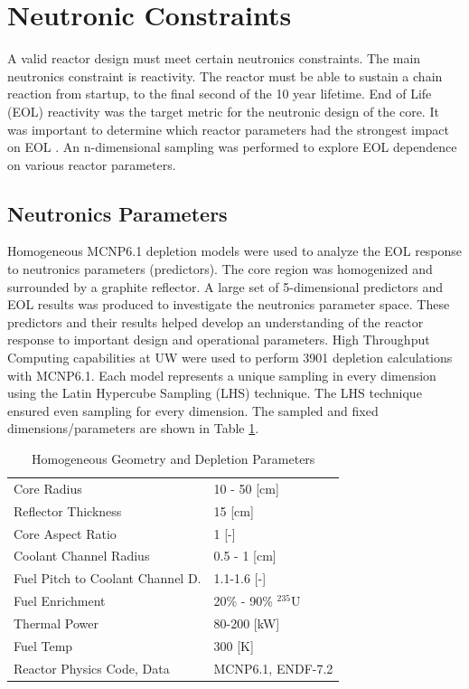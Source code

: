 \section{Neutronic Constraints}

A valid reactor design must meet certain neutronics constraints. The main
neutronics constraint is reactivity. The reactor must be able to sustain a chain
reaction from startup, to the final second of the 10 year lifetime. End of Life
(EOL) reactivity was the target metric for the neutronic design of the core. It
was important to determine which reactor parameters had the strongest impact on
EOL \keff. An n-dimensional sampling was performed to explore EOL \keff
dependence on various reactor parameters.

\subsection{Neutronics Parameters}
Homogeneous MCNP6.1 depletion models were used to analyze the EOL \keff response
to neutronics parameters (predictors). The core region was homogenized and
surrounded by a graphite reflector. A large set of 5-dimensional predictors and
EOL \keff results was produced to investigate the neutronics parameter space.
These predictors and their results helped develop an understanding of the
reactor response to important design and operational parameters. High Throughput
Computing capabilities at UW were used to perform 3901 depletion calculations
with MCNP6.1. Each model represents a unique sampling in every dimension using
the Latin Hypercube Sampling (LHS) technique. The LHS technique ensured even
sampling for every dimension. The sampled and fixed dimensions/parameters are
shown in Table \ref{tab:lhs_sweep_vars}.

\begin{table}[h]
  \centering
  \caption{Homogeneous Geometry and Depletion Parameters}
  \begin{tabular}{ll}
    \toprule
     Core Radius                		   & 10 - 50 [cm] \\
     Reflector Thickness				   & 15 [cm]\\
     Core Aspect Ratio					   & 1 [-] \\
     Coolant Channel Radius                & 0.5 - 1 [cm] \\
     Fuel Pitch to Coolant Channel D.      & 1.1-1.6 [-]\\
     Fuel Enrichment 					   & 20\% - 90\% $^{235}$U\\
     Thermal Power						   & 80-200 [kW]\\
     Fuel Temp  						   & 300 [K]\\
     Reactor Physics Code, Data			   & MCNP6.1, ENDF-7.2
  \end{tabular}
  \label{tab:lhs_sweep_vars}
\end{table}

